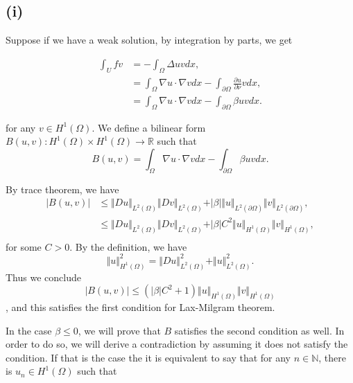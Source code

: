 \documentclass{article}
\begin{document}
\subsection*{(i)}

Suppose if we have a weak solution, by integration by parts, we get

\begin{align*}
\int_U fv &=-\int_\Omega \Delta uvdx,\\
& =  \int_{\Omega}\nabla u\cdot\nabla vdx-\int_{\partial\Omega}{\frac {\partial u} {\partial \nu}}vdx ,\\
&= \int_{\Omega}\nabla u\cdot\nabla vdx-\int_{\partial\Omega}\beta uvdx .
\end{align*}

for any $v\in H^1(\Omega)$. We define a bilinear form $B(u,v):H^1(\Omega)\times H^1(\Omega)\to\mathbb{R}$ such that
\begin{equation*}
B(u,v) =  \int_{\Omega}\nabla u\cdot\nabla vdx-\int_{\partial\Omega}\beta uvdx.
\end{equation*}

By trace theorem, we have
\begin{align*}
|B(u,v)| &\leq \Vert Du\Vert_{L^2(\Omega)}\Vert Dv\Vert_{L^2(\Omega)}+\vert\beta\vert\Vert u\Vert_{L^2(\partial\Omega)}\Vert v\Vert_{L^2(\partial\Omega)},\\
&\leq \Vert Du\Vert_{L^2(\Omega)}\Vert Dv\Vert_{L^2(\Omega)}+\vert\beta\vert C^2\Vert u\Vert_{H^1(\Omega)}\Vert v\Vert_{H^1(\Omega)},\\
\end{align*}
for some $C>0$. By the definition, we have
\begin{equation*}
\Vert u\Vert_{H^1(\Omega)}^2 = \Vert Du\Vert_{L^2(\Omega)}^2+\Vert u\Vert_{L^2(\Omega)}^2.
\end{equation*}
Thus we conclude
\begin{equation*}
|B(u,v)|\leq (\vert\beta\vert C^2+1)\Vert u\Vert_{H^1(\Omega)}\Vert v\Vert_{H^1(\Omega)}
\end{equation*}
, and this satisfies the first condition for Lax-Milgram theorem.\\

\par In the case $\beta\leq 0$, we will prove that $B$ satisfies the second condition as well. In order to do so, we will derive a contradiction by assuming it does not satisfy the condition. If that is the case the it is equivalent to say that for any $n\in\mathbb{N}$, there is $u_n\in H^1(\Omega)$ such that
\end{document}
